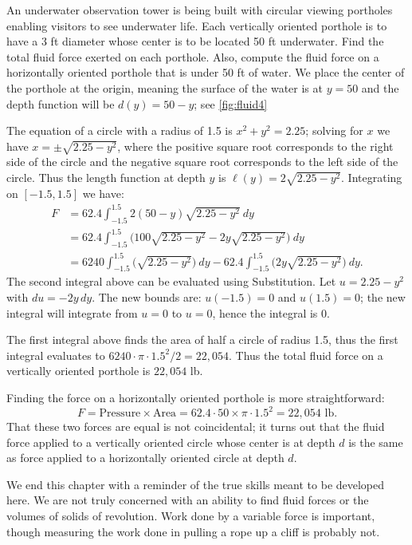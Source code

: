 \begin{example}\label{ex_fluid4}
An underwater observation tower is being built with circular viewing portholes enabling visitors to see underwater life. Each vertically oriented porthole is to have a 3 ft diameter whose center is to be located 50 ft underwater. Find the total fluid force exerted on each porthole. Also, compute the fluid force on a horizontally oriented porthole that is under 50 ft of water.
\solution
We place the center of the porthole at the origin, meaning the surface of the water is at $y=50$ and the depth function will be $d(y)=50-y$; see \autoref{fig:fluid4} 

The equation of a circle with a radius of 1.5 is $x^2+y^2=2.25$; solving for $x$ we have $x=\pm \sqrt{2.25-y^2}$, where the positive square root corresponds to the right side of the circle and the negative square root corresponds to the left side of the circle. Thus the length function at depth $y$ is $\ell(y) = 2\sqrt{2.25-y^2}$. Integrating on $[-1.5,1.5]$ we have:
\begin{align*}
	F
	&= 62.4\int_{-1.5}^{1.5} 2(50-y)\sqrt{2.25-y^2}\ dy \\
	&= 62.4\int_{-1.5}^{1.5} \bigl(100\sqrt{2.25-y^2} - 2y\sqrt{2.25-y^2}\bigr)\ dy \\
	&= 6240\int_{-1.5}^{1.5} \bigl(\sqrt{2.25-y^2}\bigr)\ dy - 62.4\int_{-1.5}^{1.5} \bigl(2y\sqrt{2.25-y^2}\bigr)\ dy.
\end{align*}			
The second integral above can be evaluated using Substitution. Let $u=2.25-y^2$ with $du = -2y\,dy$. The new bounds are: $u(-1.5)=0$ and $u(1.5)=0$; the new integral will integrate from $u=0$ to $u=0$, hence the integral is 0.

The first integral above finds the area of half a circle of radius 1.5, thus the first integral evaluates to $6240\cdot\pi\cdot1.5^2/2 = 22,054$. Thus the total fluid force on a vertically oriented porthole is $22,054$ lb.

Finding the force on a horizontally oriented porthole is more straightforward:
\[
F = \text{Pressure}\times\text{Area} = 62.4\cdot50\times \pi\cdot1.5^2
 = 22,054\text{ lb}.
\]
That these two forces are equal is not coincidental; it turns out that the fluid force applied to a vertically oriented circle whose center is at depth $d$ is the same as force applied to a horizontally oriented circle at depth $d$.
\end{example}

We end this chapter with a reminder of the true skills meant to be developed here. We are not truly concerned with an ability to find fluid forces or the volumes of solids of revolution. Work done by a variable force is important, though measuring the work done in pulling a rope up a cliff is probably not.

